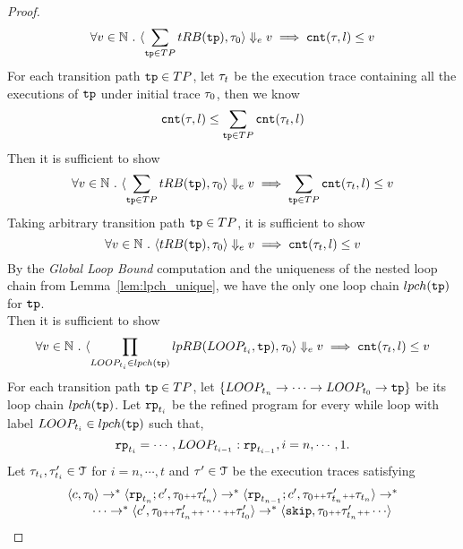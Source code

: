 \begin{proof}
          \[
          \forall v \in \mathbb{N} ~.~ 
          \langle \sum\limits_{\mathtt{tp} \in TP} tRB(\mathtt{tp}), \mathtt{\tau}_0
           \rangle \Downarrow_e v \implies  \mathtt{cnt}(\mathtt{\tau}, l) \leq v
          \]
          For each transition path $\mathtt{tp} \in TP$, let $\mathtt{\tau}_t$ be the execution trace 
          containing all the executions of $\mathtt{tp}$
          under initial trace $\mathtt{\tau}_0$, then we know 
          \[
            \mathtt{cnt}(\mathtt{\tau}, l) \leq \sum_{\mathtt{tp} \in TP} \mathtt{cnt}(\mathtt{\tau}_t, l) 
          \]
          Then it is sufficient to show 
          \[
          \forall v \in \mathbb{N} ~.~ 
          \langle \sum\limits_{\mathtt{tp} \in TP} tRB(\mathtt{tp}), \mathtt{\tau}_0
           \rangle \Downarrow_e v \implies \sum_{\mathtt{tp} \in TP} \mathtt{cnt}(\mathtt{\tau}_t, l) \leq v
          \]
          Taking arbitrary transition path $\mathtt{tp} \in TP$, it is sufficient to show 
          \[
            \forall v \in \mathbb{N} ~.~ 
            \langle tRB(\mathtt{tp}), \mathtt{\tau}_0
             \rangle \Downarrow_e v \implies \mathtt{cnt}(\mathtt{\tau}_t, l) \leq v
            \]
          By the \emph{Global Loop Bound} computation and the uniqueness of the 
          nested loop chain from Lemma~\ref{lem:lpch_unique}, 
          we have the only one loop chain $lpch(\mathtt{tp})$ for $\mathtt{tp}$.
          \\
          Then it is sufficient to show 
          \[
            \forall v \in \mathbb{N} ~.~ 
          \langle \prod_{LOOP_{t_i} \in lpch(\mathtt{tp})} lpRB(LOOP_{t_i}, \mathtt{tp}), \mathtt{\tau}_0
           \rangle \Downarrow_e v \implies  \mathtt{cnt}(\mathtt{\tau}_t, l) \leq v
        \]
        For each transition path $\mathtt{tp} \in TP$, 
        let $\{LOOP_{t_n} \to \cdots \to LOOP_{t_0} \to \mathtt{tp}\}$
        be its loop chain $lpch(\mathtt{tp})$. 
        Let $\mathtt{rp}_{t_i}$ be the refined program for every while loop 
        with label $LOOP_{t_i} \in lpch(\mathtt{tp})$ such that,
        \[
          \mathtt{rp}_{t_{i}} = \cdots, LOOP_{t_{i - 1}}:\mathtt{rp}_{t_{i - 1}}, i = n, \cdots, {1}.
        \] 
        Let $\mathtt{\tau}_{t_i}, \mathtt{\tau}_{t_i}' \in \mathcal{T}$ for $i = n, \cdots, t$ and $\mathtt{\tau}' \in \mathcal{T}$ be the execution traces satisfying
        \[
          \begin{array}{l}
          \config{c, \trace_0} \to^{*} \config{\rprog_{t_n};c', \trace_0 \tracecat \trace_{t_n}'}
        \to^{*} \config{\rprog_{t_{n - 1}};c', \trace_0 \tracecat \trace_{t_n}' \tracecat \trace_{t_n}}
        \to^{*} 
        \\ \qquad 
        \cdots \to^{*} \config{c', \trace_0 \tracecat \trace_{t_n}' \tracecat \cdots \tracecat
        \trace_{t_0}'} \to^{*} \config{\eskip, \trace_0 \tracecat \trace_{t_n}' \tracecat \cdots 
}
\end{array}\]
\end{proof}
